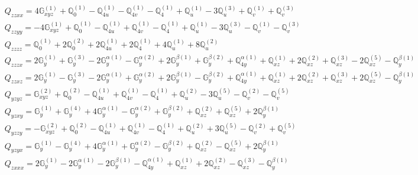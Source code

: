 \documentclass[fleqn,8pt,landscape]{jsarticle}
\begin{document}
\begin{align*}
& Q_{zzxx} = 4 \mathbb{G}_{xyz}^{(1)} + \mathbb{Q}_{0}^{(1)} - \mathbb{Q}_{4u}^{(1)} - \mathbb{Q}_{4v}^{(1)} - \mathbb{Q}_{4}^{(1)} + \mathbb{Q}_{u}^{(1)} - 3 \mathbb{Q}_{u}^{(3)} + \mathbb{Q}_{v}^{(1)} + \mathbb{Q}_{v}^{(3)} \\
& Q_{zzyy} = - 4 \mathbb{G}_{xyz}^{(1)} + \mathbb{Q}_{0}^{(1)} - \mathbb{Q}_{4u}^{(1)} + \mathbb{Q}_{4v}^{(1)} - \mathbb{Q}_{4}^{(1)} + \mathbb{Q}_{u}^{(1)} - 3 \mathbb{Q}_{u}^{(3)} - \mathbb{Q}_{v}^{(1)} - \mathbb{Q}_{v}^{(3)} \\
& Q_{zzzz} = \mathbb{Q}_{0}^{(1)} + 2 \mathbb{Q}_{0}^{(2)} + 2 \mathbb{Q}_{4u}^{(1)} + 2 \mathbb{Q}_{4}^{(1)} + 4 \mathbb{Q}_{u}^{(1)} + 8 \mathbb{Q}_{u}^{(2)} \\
& Q_{zzzx} = 2 \mathbb{G}_{y}^{(1)} + \mathbb{G}_{y}^{(3)} - 2 \mathbb{G}_{y}^{\alpha(1)} - \mathbb{G}_{y}^{\alpha(2)} + 2 \mathbb{G}_{y}^{\beta(1)} + \mathbb{G}_{y}^{\beta(2)} + \mathbb{Q}_{4y}^{\alpha(1)} + \mathbb{Q}_{xz}^{(1)} + 2 \mathbb{Q}_{xz}^{(2)} + \mathbb{Q}_{xz}^{(3)} - 2 \mathbb{Q}_{xz}^{(5)} - \mathbb{Q}_{y}^{\beta(1)} \\
& Q_{zzxz} = 2 \mathbb{G}_{y}^{(1)} - \mathbb{G}_{y}^{(3)} - 2 \mathbb{G}_{y}^{\alpha(1)} + \mathbb{G}_{y}^{\alpha(2)} + 2 \mathbb{G}_{y}^{\beta(1)} - \mathbb{G}_{y}^{\beta(2)} + \mathbb{Q}_{4y}^{\alpha(1)} + \mathbb{Q}_{xz}^{(1)} + 2 \mathbb{Q}_{xz}^{(2)} + \mathbb{Q}_{xz}^{(3)} + 2 \mathbb{Q}_{xz}^{(5)} - \mathbb{Q}_{y}^{\beta(1)} \\
& Q_{yzyz} = \mathbb{G}_{xyz}^{(2)} + \mathbb{Q}_{0}^{(2)} - \mathbb{Q}_{4u}^{(1)} + \mathbb{Q}_{4v}^{(1)} - \mathbb{Q}_{4}^{(1)} + \mathbb{Q}_{u}^{(2)} - 3 \mathbb{Q}_{u}^{(5)} - \mathbb{Q}_{v}^{(2)} - \mathbb{Q}_{v}^{(5)} \\
& Q_{yzxy} = \mathbb{G}_{y}^{(1)} + \mathbb{G}_{y}^{(4)} + 4 \mathbb{G}_{y}^{\alpha(1)} - \mathbb{G}_{y}^{\alpha(2)} + \mathbb{G}_{y}^{\beta(2)} + \mathbb{Q}_{xz}^{(2)} + \mathbb{Q}_{xz}^{(5)} + 2 \mathbb{Q}_{y}^{\beta(1)} \\
& Q_{yzzy} = - \mathbb{G}_{xyz}^{(2)} + \mathbb{Q}_{0}^{(2)} - \mathbb{Q}_{4u}^{(1)} + \mathbb{Q}_{4v}^{(1)} - \mathbb{Q}_{4}^{(1)} + \mathbb{Q}_{u}^{(2)} + 3 \mathbb{Q}_{u}^{(5)} - \mathbb{Q}_{v}^{(2)} + \mathbb{Q}_{v}^{(5)} \\
& Q_{yzyx} = \mathbb{G}_{y}^{(1)} - \mathbb{G}_{y}^{(4)} + 4 \mathbb{G}_{y}^{\alpha(1)} + \mathbb{G}_{y}^{\alpha(2)} - \mathbb{G}_{y}^{\beta(2)} + \mathbb{Q}_{xz}^{(2)} - \mathbb{Q}_{xz}^{(5)} + 2 \mathbb{Q}_{y}^{\beta(1)} \\
& Q_{zxxx} = 2 \mathbb{G}_{y}^{(1)} - 2 \mathbb{G}_{y}^{\alpha(1)} - 2 \mathbb{G}_{y}^{\beta(1)} - \mathbb{Q}_{4y}^{\alpha(1)} + \mathbb{Q}_{xz}^{(1)} + 2 \mathbb{Q}_{xz}^{(2)} - \mathbb{Q}_{xz}^{(3)} - \mathbb{Q}_{y}^{\beta(1)} \\

\end{align*}
\end{document}

